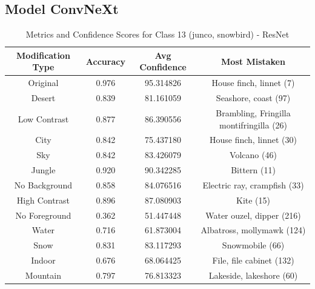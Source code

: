\subsection*{Model ConvNeXt}


\begin{table}
	\centering
	\begin{tabular}{|c|c|c|c|}
		\hline
		\textbf{Modification Type} & \textbf{Accuracy} & \textbf{Avg Confidence} & \textbf{Most Mistaken} \\
		\hline
		Original & 0.976 & 95.314826 & House finch, linnet (7) \\
		\hline
		Desert & 0.839 & 81.161059 & Seashore, coast (97) \\
		\hline
		Low Contrast & 0.877 & 86.390556 & Brambling, Fringilla montifringilla (26) \\
		\hline
		City & 0.842 & 75.437180 & House finch, linnet (30) \\
		\hline
		Sky & 0.842 & 83.426079 & Volcano (46) \\
		\hline
		Jungle & 0.920 & 90.342285 & Bittern (11) \\
		\hline
		No Background & 0.858 & 84.076516 & Electric ray, crampfish (33) \\
		\hline
		High Contrast & 0.896 & 87.080903 & Kite (15) \\
		\hline
		No Foreground & 0.362 & 51.447448 & Water ouzel, dipper (216) \\
		\hline
		Water & 0.716 & 61.873004 & Albatross, mollymawk (124) \\
		\hline
		Snow & 0.831 & 83.117293 & Snowmobile (66) \\
		\hline
		Indoor & 0.676 & 68.064425 & File, file cabinet (132) \\
		\hline
		Mountain & 0.797 & 76.813323 & Lakeside, lakeshore (60) \\
		\hline
	\end{tabular}
	\caption{Metrics and Confidence Scores for Class 13 (junco, snowbird) - ResNet}
	\label{tab:metrics_confidence_class_13_resnet}
\end{table}

